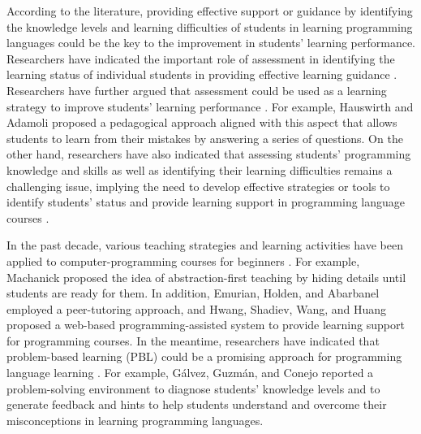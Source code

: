 According to the literature, providing effective support or guidance by identifying the knowledge levels and learning difficulties of students in learning programming languages could be the key to the improvement in students’ learning performance. Researchers have indicated the important role of assessment in identifying the learning status of individual students in providing effective learning guidance \cite{HWANG2003217} \cite{BJET1319} \cite{TSENG2008776}. Researchers have further argued that assessment could be used as a learning strategy to improve students’ learning performance \cite{CHU20101618} \cite{GALVEZ2009279} . For example, Hauswirth and Adamoli \cite{HAUSWIRTH2013499} proposed a pedagogical approach aligned with this aspect that allows students to learn from their mistakes by answering a series of questions. On the other hand, researchers have also indicated that assessing students’ programming knowledge and skills as well as identifying their learning difficulties remains a challenging issue, implying the need to develop effective strategies or tools to identify students’ status and provide learning support in programming language courses \cite{WANG2012412}.   
 
In the past decade, various teaching strategies and learning activities have been applied to computer-programming courses for beginners \cite{GOVENDER20091218}. For example, Machanick \cite{MACHANICK2007396} proposed the idea of abstraction-first teaching by hiding details until students are ready for them. In addition, Emurian, Holden, and Abarbanel \cite{EMURIAN2008576} employed a peer-tutoring approach, and Hwang, Shadiev, Wang, and Huang \cite{HWANG20121267} proposed a web-based programming-assisted system to provide learning support for programming courses. In the meantime, researchers have indicated that problem-based learning (PBL) could be a promising approach for programming language learning \cite{KORDAKI201069}. For example, Gálvez, Guzmán, and Conejo \cite{GALVEZ2009279} reported a problem-solving environment to diagnose students’ knowledge levels and to generate feedback and hints to help students understand and overcome their misconceptions in learning programming languages. 


